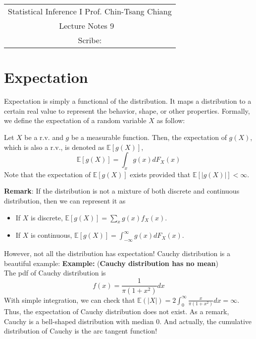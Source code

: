 \documentclass[../Transformation.tex]{subfiles}
\begin{document}
	\begin{center}
		\renewcommand{\arraystretch}{2}
		\begin{bfseries}
			\begin{tabular}{|c|}
				\hline
				Statistical Inference I \hfill Prof. Chin-Tsang Chiang\\
				\hspace{15em} {\large Lecture Notes 9} \hspace{15em}\ \\
				\lecdate \hfill Scribe: \scribe\\
				\hline
			\end{tabular}
			\renewcommand{\arraystretch}{1}
		\end{bfseries}
	\end{center}
	
\section{Expectation}
Expectation is simply a functional of the distribution. It maps a distribution to a certain real value to represent the behavior, shape, or other properties. Formally, we define the expectation of a random variable $X$ as follow:
\begin{definition}[expectation]
	Let $X$ be a r.v. and $g$ be a measurable function. Then, the expectation of $g(X)$, which is also a r.v., is denoted as $\mathbb{E}[g(X)]$,\ie
	$$\mathbb{E}[g(X)] = \int_x g(x)dF_X(x)$$
	Note that the expectation of $\mathbb{E}[g(X)]$ exists provided that $\mathbb{E}[|g(X)|]<\infty$.
\end{definition}
{\bf Remark}:
If the distribution is not a mixture of both discrete and continuous distribution, then we can represent it as
\begin{itemize}
	\item If $X$ is discrete, $\mathbb{E}[g(X)] = \sum_x g(x)f_X(x)$.
	\item If $X$ is continuous, $\mathbb{E}[g(X)] = \int_{-\infty}^{\infty}g(x)dF_X(x)$.
\end{itemize}

However, not all the distribution has expectation! Cauchy distribution is a beautiful example:
{\bf Example: }({\bf Cauchy distribution has no mean})\\
The pdf of Cauchy distribution is
$$f(x) = \frac{1}{\pi(1+x^2)}dx$$
With simple integration, we can check that $\mathbb{E}(|X|) = 2\int_0^{\infty}\frac{x}{\pi(1+x^2)}dx=\infty$. Thus, the expectation of Cauchy distribution does not exist. As a remark, Cauchy is a bell-shaped distribution with median 0. And actually, the cumulative distribution of Cauchy is the arc tangent function!
\end{document}

